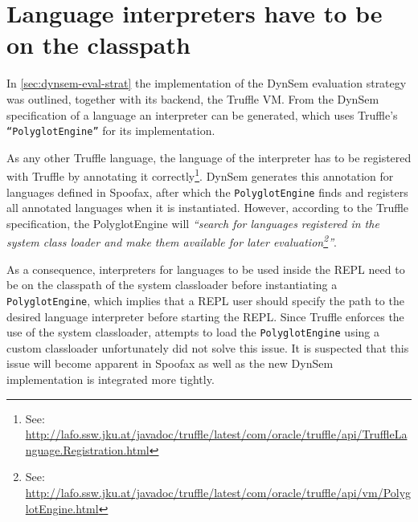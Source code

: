 \section{Language interpreters have to be on the classpath}
\label{sec:classpath}

In \cref{sec:dynsem-eval-strat} the implementation of the DynSem evaluation
strategy was outlined, together with its backend, the Truffle VM.  From the
DynSem specification of a language an interpreter can be generated, which uses
Truffle's \texttt{``PolyglotEngine''} for its implementation.

As any other Truffle language, the language of the interpreter has to be
registered with Truffle by annotating it correctly\footnote{See:
\url{http://lafo.ssw.jku.at/javadoc/truffle/latest/com/oracle/truffle/api/TruffleLanguage.Registration.html}}.
DynSem generates this annotation for languages defined in Spoofax, after which
the \texttt{PolyglotEngine} finds and registers all annotated languages when it
is instantiated. However, according to the Truffle specification, the
PolyglotEngine will \textit{``search for languages registered in the system class
loader and make them available for later evaluation\footnote{See:
\url{http://lafo.ssw.jku.at/javadoc/truffle/latest/com/oracle/truffle/api/vm/PolyglotEngine.html}}''}.

As a consequence, interpreters for languages to be used inside the REPL need to
be on the classpath of the system classloader before instantiating a
\texttt{PolyglotEngine}, which implies that a REPL user should specify the path to
the desired language interpreter before starting the REPL. Since Truffle
enforces the use of the system classloader, attempts to load the
\texttt{PolyglotEngine} using a custom classloader unfortunately did not solve this
issue. It is suspected that this issue will become apparent in Spoofax as well as the new
DynSem implementation is integrated more tightly.

